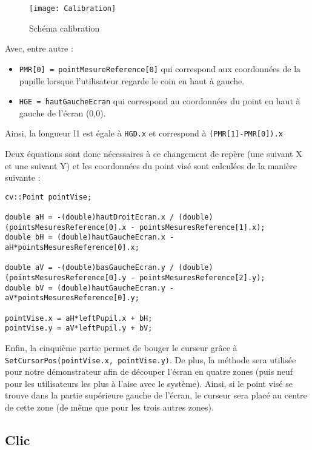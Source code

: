\begin{figure}[H]
  \centering
  \texttt{[image: Calibration]}
  \caption{Schéma calibration}
  \label{fig:calib}
\end{figure}

Avec, entre autre :
\begin{itemize}[font=\tiny, label=]
\item \lstinline-PMR[0] = pointMesureReference[0]- qui correspond aux coordonnées de la pupille lorsque l’utilisateur regarde le coin en haut à gauche.
\item \lstinline-HGE = hautGaucheEcran- qui correspond au coordonnées du point en haut à gauche de l’écran (0,0).
\end{itemize}

Ainsi, la longueur l1 est égale à \lstinline=HGD.x= et correspond à \lstinline=(PMR[1]-PMR[0]).x=

Deux équations sont donc nécessaires à ce changement de repère (une suivant X et une suivant Y) et les coordonnées du point visé sont calculées de la manière suivante :

\begin{lstlisting}
cv::Point pointVise;

double aH = -(double)hautDroitEcran.x / (double)(pointsMesuresReference[0].x - pointsMesuresReference[1].x);
double bH = (double)hautGaucheEcran.x - aH*pointsMesuresReference[0].x;

double aV = -(double)basGaucheEcran.y / (double)(pointsMesuresReference[0].y - pointsMesuresReference[2].y);
double bV = (double)hautGaucheEcran.y - aV*pointsMesuresReference[0].y;

pointVise.x = aH*leftPupil.x + bH;
pointVise.y = aV*leftPupil.y + bV;
\end{lstlisting}

Enfin, la cinquième partie permet de bouger le curseur grâce à \lstinline=SetCursorPos(pointVise.x, pointVise.y)=. De plus, la méthode  sera utilisée pour notre démonstrateur afin de découper l’écran en quatre zones (puis neuf pour les utilisateurs les plus à l'aise avec le système). Ainsi, si le point visé se trouve dans la partie supérieure gauche de l’écran, le curseur sera placé au centre de cette zone (de même que pour les trois autres zones). 

\subsection{Clic}

